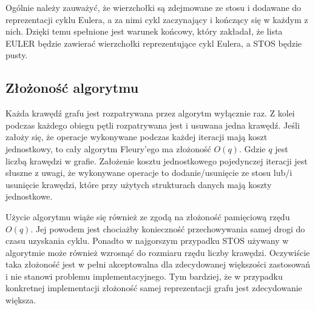 Ogólnie należy zauważyć, że wierzchołki są zdejmowane ze stosu i dodawane do reprezentacji cyklu Eulera, a za nimi cykl zaczynający i kończący się w każdym z nich.
Dzięki temu spełnione jest warunek końcowy, który zakładał, że lista EULER będzie zawierać wierzchołki reprezentujące cykl Eulera, a STOS będzie pusty.

\subsection{Złożoność algorytmu}

Każda krawędź grafu jest rozpatrywana przez algorytm wyłącznie raz. Z kolei podczas każdego obiegu pętli rozpatrywana jest i usuwana jedna krawędź. 
Jeśli założy się, że operacje wykonywane podczas każdej iteracji mają koszt jednostkowy, to cały algorytm Fleury'ego ma złożoność $O(q)$. Gdzie $q$ jest liczbą krawędzi w grafie.
Założenie kosztu jednostkowego pojedynczej iteracji jest słuszne z uwagi, że wykonywane operacje to dodanie/usunięcie ze stosu lub/i usunięcie krawędzi, które przy użytych strukturach danych mają koszty jednostkowe.

Użycie algorytmu wiąże się również ze zgodą na złożoność pamięciową rzędu $O(q)$.
Jej powodem jest chociażby konieczność przechowywania samej drogi do czasu uzyskania cyklu.
Ponadto w najgorszym przypadku STOS używany w algorytmie może również wzrosnąć do rozmiaru rzędu liczby krawędzi.
Oczywiście taka złożoność jest w pełni akceptowalna dla zdecydowanej większości zastosowań i nie stanowi problemu implementacyjnego. 
Tym bardziej, że w przypadku konkretnej implementacji złożoność samej reprezentacji grafu jest zdecydowanie większa.
